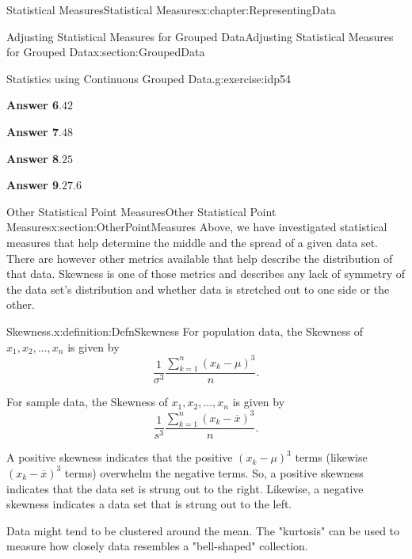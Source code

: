 \documentclass[oneside,10pt,]{book}
\newcommand{\blocktitlefont}{\relax}
\numberwithin{equation}{section}
\begin{document}
\begin{chapterptx}{Statistical Measures}{}{Statistical Measures}{}{}{x:chapter:RepresentingData}
\begin{sectionptx}{Adjusting Statistical Measures for Grouped Data}{}{Adjusting Statistical Measures for Grouped Data}{}{}{x:section:GroupedData}
\begin{inlineexercise}{Statistics using Continuous Grouped Data.}{g:exercise:idp54}
\par\smallskip%
\noindent\textbf{\blocktitlefont Answer 6}.\hypertarget{g:answer:idp60}{}\quad{}\(42\)%
\par\smallskip%
\noindent\textbf{\blocktitlefont Answer 7}.\hypertarget{g:answer:idp61}{}\quad{}\(48\)%
\par\smallskip%
\noindent\textbf{\blocktitlefont Answer 8}.\hypertarget{g:answer:idp62}{}\quad{}\(25\)%
\par\smallskip%
\noindent\textbf{\blocktitlefont Answer 9}.\hypertarget{g:answer:idp63}{}\quad{}\(27.6\)%
\end{inlineexercise}%
\end{sectionptx}
%
%
\typeout{************************************************}
\typeout{************************************************}
%
\begin{sectionptx}{Other Statistical Point Measures}{}{Other Statistical Point Measures}{}{}{x:section:OtherPointMeasures}
Above, we have investigated statistical measures that help determine the middle and the spread of a given data set. There are however other metrics available that help describe the distribution of that data.  Skewness is one of those metrics and describes any lack of symmetry of the data set's distribution and whether data is stretched out to one side or the other.%
\par
\begin{definition}{Skewness.}{x:definition:DefnSkewness}%
For population data, the Skewness of \(x_1, x_2, ..., x_n\) is given by%
\begin{equation*}
\frac{1}{\sigma^3} \frac{\sum_{k=1}^n ( x_k-\mu )^3}{n}.
\end{equation*}
%
\par
For sample data, the Skewness of \(x_1, x_2, ..., x_n\) is given by%
\begin{equation*}
\frac{1}{s^3} \frac{\sum_{k=1}^n ( x_k-\overline{x} )^3}{n}.
\end{equation*}
%
\end{definition}
%
\par
A positive skewness indicates that the positive \((x_k - \mu)^3\) terms (likewise \((x_k - \overline{x})^3\) terms) overwhelm the negative terms. So, a positive skewness indicates that the data set is strung out to the right. Likewise, a negative skewness indicates a data set that is strung out to the left.%
\par
Data might tend to be clustered around the mean. The "kurtosis" can be used to measure how closely data resembles a "bell-shaped" collection.%

\end{sectionptx}
\end{chapterptx}
\end{document}
